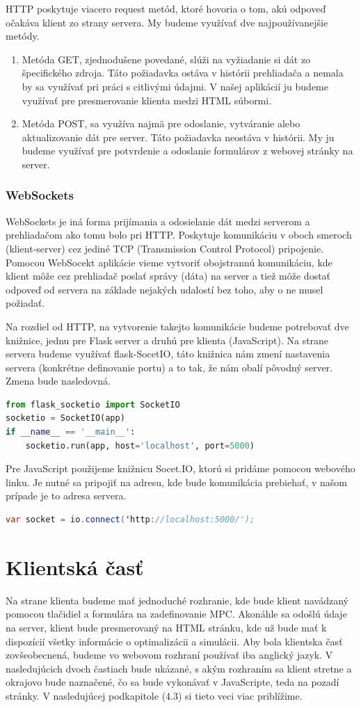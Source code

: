 HTTP poskytuje viacero request metód, ktoré hovoria o tom, akú odpoveď očakáva klient zo strany servera. My budeme využívať dve najpoužívanejšie metódy.
\begin{enumerate}
\item { Metóda GET, zjednodušene povedané, slúži na vyžiadanie si dát zo špecifického zdroja. Táto požiadavka ostáva v histórii prehliadača a nemala by sa využívať pri práci s citlivými údajmi. V našej aplikácií ju budeme využívať pre presmerovanie klienta medzi HTML súbormi.  
}
\item { Metóda POST, sa využíva najmä pre odoslanie, vytváranie alebo aktualizovanie dát pre server. Táto požiadavka neostáva v histórii. My ju budeme využívať pre potvrdenie a odoslanie formulárov z webovej stránky na server.  
}
\end{enumerate}

\subsubsection{WebSockets}
WebSockets je iná forma prijímania a odosielanie dát medzi serverom a prehliadačom ako tomu bolo pri HTTP. Poskytuje komunikáciu v oboch smeroch (klient-server) cez jediné TCP (Transmission Control Protocol) pripojenie. Pomocou WebSocekt aplikácie vieme vytvoriť obojstrannú komunikáciu, kde klient môže cez prehliadač poslať správy (dáta) na server a tiež môže dostať odpoveď od servera na základe nejakých udalostí bez toho, aby o ne musel požiadať.

Na rozdiel od HTTP, na vytvorenie takejto komunikácie budeme potrebovať dve knižnice, jednu pre Flask server a druhú pre klienta (JavaScript). Na strane servera budeme využívať flask-SocetIO, táto knižnica nám zmení nastavenia servera (konkrétne definovanie portu) a to tak, že nám obalí pôvodný server. Zmena bude nasledovná.
\begin{lstlisting}[language=Python]
from flask_socketio import SocketIO
socketio = SocketIO(app)
if __name__ == '__main__':
	socketio.run(app, host='localhost', port=5000)
\end{lstlisting}
Pre JavaScript použijeme knižnicu Socet.IO, ktorú si pridáme pomocou webového linku. Je nutné sa pripojiť na adresu, kde bude komunikácia prebiehať, v našom prípade je to adresa servera.
\begin{lstlisting}[language=Java]
var socket = io.connect('http://localhost:5000/');
\end{lstlisting}

\section{Klientská časť}
Na strane klienta budeme mať jednoduché rozhranie, kde bude klient navádzaný pomocou tlačidiel a formulára na zadefinovanie MPC. Akonáhle sa odošlú údaje na server, klient bude presmerovaný na HTML stránku, kde už bude mať k dispozícií všetky informácie o optimalizácii a simulácii. Aby bola klientska časť zovšeobecnená, budeme vo webovom rozhraní používať iba anglický jazyk. V nasledujúcich dvoch častiach bude ukázané, s akým rozhraním sa klient stretne a okrajovo bude naznačené, čo sa bude vykonávať v JavaScripte, teda na pozadí stránky. V nasledujúcej podkapitole (4.3) si tieto veci viac priblížime. 
